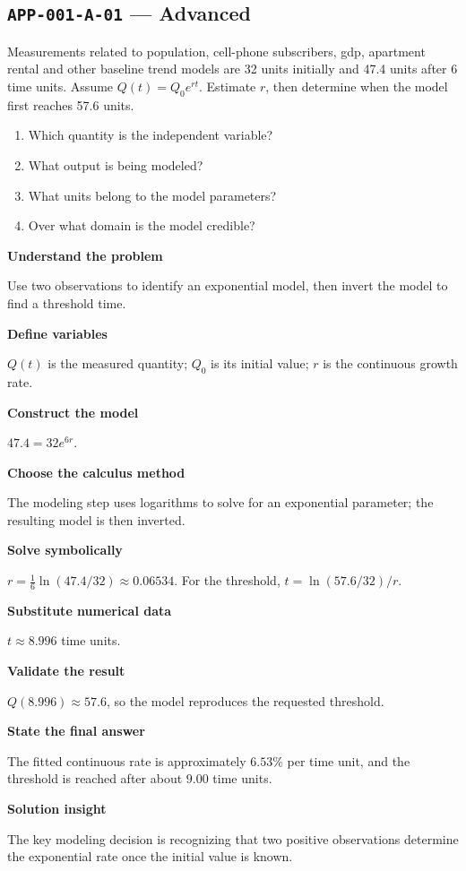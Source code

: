 \documentclass[11pt]{book}
\newcommand{\pid}[1]{\texttt{#1}}
\begin{document}
\subsection*{\pid{APP-001-A-01} — Advanced}
\begin{problembox}
Measurements related to population, cell-phone subscribers, gdp, apartment rental and other baseline trend models are 32 units initially and 47.4 units after 6 time units. Assume $Q(t)=Q_0e^{rt}$. Estimate $r$, then determine when the model first reaches 57.6 units.
\end{problembox}
\begin{promptbox}\begin{enumerate}
\item Which quantity is the independent variable?
\item What output is being modeled?
\item What units belong to the model parameters?
\item Over what domain is the model credible?
\end{enumerate}\end{promptbox}
\begin{solutionbox}
\textbf{Understand the problem}\par Use two observations to identify an exponential model, then invert the model to find a threshold time.\par\medskip
\textbf{Define variables}\par $Q(t)$ is the measured quantity; $Q_0$ is its initial value; $r$ is the continuous growth rate.\par\medskip
\textbf{Construct the model}\par $47.4=32e^{6r}$.\par\medskip
\textbf{Choose the calculus method}\par The modeling step uses logarithms to solve for an exponential parameter; the resulting model is then inverted.\par\medskip
\textbf{Solve symbolically}\par $r=\frac1{6}\ln(47.4/32)\approx 0.06534$. For the threshold, $t=\ln(57.6/32)/r$.\par\medskip
\textbf{Substitute numerical data}\par $t\approx 8.996$ time units.\par\medskip
\textbf{Validate the result}\par $Q(8.996)\approx 57.6$, so the model reproduces the requested threshold.\par\medskip
\textbf{State the final answer}\par The fitted continuous rate is approximately $6.53\%$ per time unit, and the threshold is reached after about $9.00$ time units.\par\medskip
\textbf{Solution insight}\par The key modeling decision is recognizing that two positive observations determine the exponential rate once the initial value is known.\par\medskip
\end{solutionbox}
\end{document}
